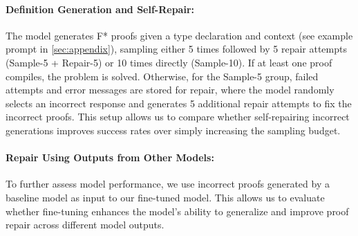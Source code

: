 


\paragraph{Definition Generation and Self-Repair:}\label{Definition Generation and Self-Repair:} The model generates F* proofs given a type declaration and context (see example prompt in \ref{sec:appendix}), sampling either 5 times followed by 5 repair attempts (Sample-5 + Repair-5) or 10 times directly (Sample-10). If at least one proof compiles, the problem is solved. Otherwise, for the Sample-5 group, failed attempts and error messages are stored for repair, where the model randomly selects an incorrect response and generates 5 additional repair attempts to fix the incorrect proofs. This setup allows us to compare whether self-repairing incorrect generations improves success rates over simply increasing the sampling budget.

\paragraph{Repair Using Outputs from Other Models:} To further assess model performance, we use incorrect proofs generated by a baseline model as input to our fine-tuned model. This allows us to evaluate whether fine-tuning enhances the model’s ability to generalize and improve proof repair across different model outputs.


